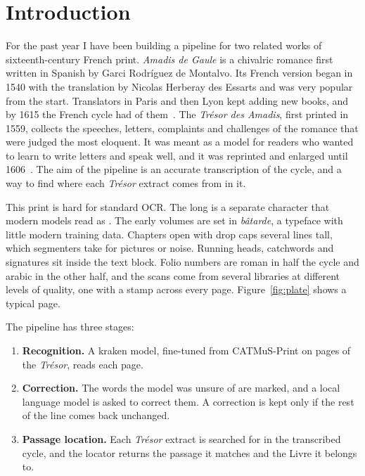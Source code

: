\section{Introduction}
\label{sec:introduction}

For the past year I have been building a pipeline for two related works of
sixteenth-century French print. \emph{Amadis de Gaule} is a chivalric romance
first written in Spanish by Garci Rodríguez de Montalvo. Its French version
began in 1540 with the translation by Nicolas Herberay des Essarts and was very
popular from the start. Translators in Paris and then Lyon kept adding new
books, and by 1615 the French cycle had \ocrBooks{} of
them~\cite{debuzon2011chappuys}. The \emph{Trésor des Amadis}, first printed in
1559, collects the speeches, letters, complaints and challenges of the romance
that were judged the most eloquent. It was meant as a model for readers who
wanted to learn to write letters and speak well, and it was reprinted and
enlarged until 1606~\cite{eman2026tresor}. The aim of the pipeline is an
accurate transcription of the cycle, and a way to find where each
\emph{Trésor} extract comes from in it.

This print is hard for standard OCR. The long  is a separate character
that modern models read as . The early volumes are set in
\emph{bâtarde}, a typeface with little modern training data. Chapters open with
drop caps several lines tall, which segmenters take for pictures or noise.
Running heads, catchwords and signatures sit inside the text block. Folio
numbers are roman in half the cycle and arabic in the other half, and the scans
come from several libraries at different levels of quality, one with a stamp
across every page. Figure~\ref{fig:plate} shows a typical page.

The pipeline has three stages:
\begin{enumerate}
  \item \textbf{Recognition.} A kraken model, fine-tuned from CATMuS-Print on
    pages of the \emph{Trésor}, reads each page.
  \item \textbf{Correction.} The words the model was unsure of are marked, and a
    local language model is asked to correct them. A correction is kept only if
    the rest of the line comes back unchanged.
  \item \textbf{Passage location.} Each \emph{Trésor} extract is searched for in
    the transcribed cycle, and the locator returns the passage it matches and
    the Livre it belongs to.
\end{enumerate}

